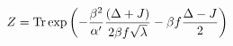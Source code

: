 \begin{equation}Z={\rm Tr} \exp \left(
-\frac {\beta^2} {\alpha'} \frac {(\Delta+J)} {2\beta f \sqrt{\lambda} }
-\beta f \frac{\Delta - J}{ 2} \right)
\label{exp}
\end{equation}

